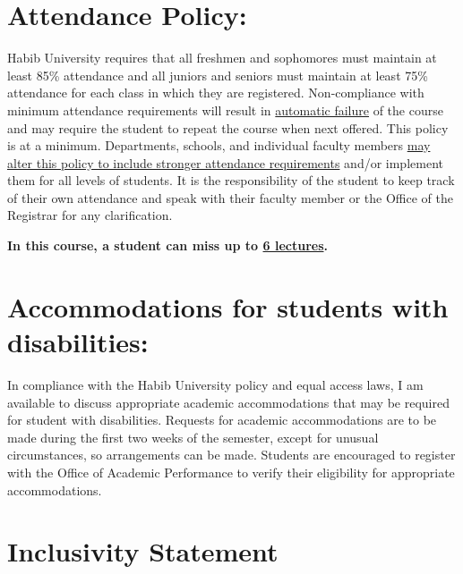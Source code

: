 \documentclass[a4paper]{article}
\begin{document}

\section{Attendance Policy:}

Habib University requires that all freshmen and sophomores must maintain at least 85\% attendance and all juniors and seniors must maintain at least 75\% attendance for each class in which they are registered. Non-compliance with minimum attendance requirements will result in \underline{automatic failure} of the course and may require the student to repeat the course when next offered. This policy is at a minimum. Departments, schools, and individual faculty members \underline{may alter this policy to include stronger attendance requirements} and/or implement them for all levels of students.  It is the responsibility of the student to keep track of their own attendance and speak with their faculty member or the Office of the Registrar for any clarification.

{\bf In this course, a student can miss up to \underline{6 lectures}.}

\section{Accommodations for students with disabilities:}

In compliance with the Habib University policy and equal access laws, I am available to discuss appropriate academic accommodations that may be required for student with disabilities. Requests for academic accommodations are to be made during the first two weeks of the semester, except for unusual circumstances, so arrangements can be made. Students are encouraged to register with the Office of Academic Performance to verify their eligibility for appropriate accommodations.

\section{Inclusivity Statement}
\end{document}

